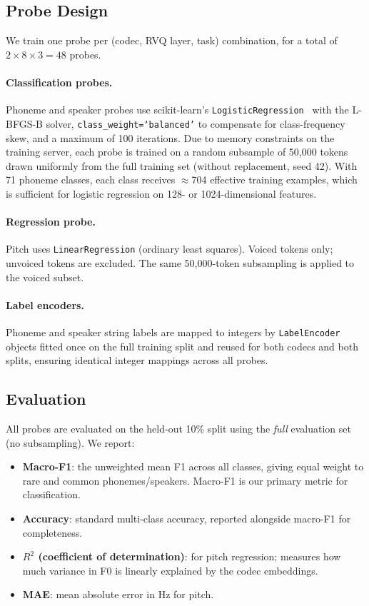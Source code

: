 \documentclass[10pt,twocolumn]{article}
\begin{document}
\subsection{Probe Design}

We train one probe per (codec, RVQ layer, task) combination, for a
total of $2 \times 8 \times 3 = 48$ probes.

\paragraph{Classification probes.}
Phoneme and speaker probes use scikit-learn's
\texttt{LogisticRegression}~\cite{sklearn} with the L-BFGS-B solver,
\texttt{class\_weight=`balanced'} to compensate for class-frequency
skew, and a maximum of 100 iterations. Due to memory constraints on
the training server, each probe is trained on a random subsample of
50,000 tokens drawn uniformly from the full training set (without
replacement, seed 42). With 71 phoneme classes, each class receives
$\approx$704 effective training examples, which is sufficient for
logistic regression on 128- or 1024-dimensional features.

\paragraph{Regression probe.}
Pitch uses \texttt{LinearRegression} (ordinary least squares). Voiced
tokens only; unvoiced tokens are excluded. The same 50,000-token
subsampling is applied to the voiced subset.

\paragraph{Label encoders.}
Phoneme and speaker string labels are mapped to integers by
\texttt{LabelEncoder} objects fitted once on the full training split
and reused for both codecs and both splits, ensuring identical integer
mappings across all probes.

\subsection{Evaluation}

All probes are evaluated on the held-out 10\% split using the
\emph{full} evaluation set (no subsampling). We report:

\begin{itemize}
  \item \textbf{Macro-F1}: the unweighted mean F1 across all classes,
        giving equal weight to rare and common phonemes/speakers.
        Macro-F1 is our primary metric for classification.
  \item \textbf{Accuracy}: standard multi-class accuracy, reported
        alongside macro-F1 for completeness.
  \item \textbf{$R^2$ (coefficient of determination)}: for pitch
        regression; measures how much variance in F0 is linearly
        explained by the codec embeddings.
  \item \textbf{MAE}: mean absolute error in Hz for pitch.
\end{itemize}
\end{document}
